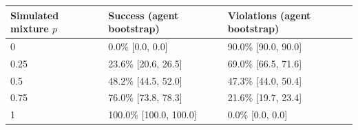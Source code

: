 \begin{tabular}{lll}\toprule
Simulated mixture $p$ & Success (agent bootstrap) & Violations (agent bootstrap) \\
\midrule
0 & 0.0\% [0.0, 0.0] & 90.0\% [90.0, 90.0] \\
0.25 & 23.6\% [20.6, 26.5] & 69.0\% [66.5, 71.6] \\
0.5 & 48.2\% [44.5, 52.0] & 47.3\% [44.0, 50.4] \\
0.75 & 76.0\% [73.8, 78.3] & 21.6\% [19.7, 23.4] \\
1 & 100.0\% [100.0, 100.0] & 0.0\% [0.0, 0.0] \\
\bottomrule\end{tabular}
